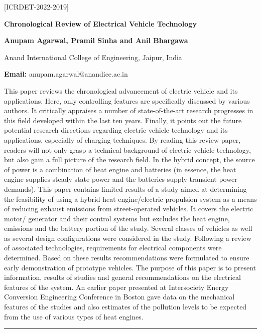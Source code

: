 \documentclass[twoside,11pt]{amsart}
\begin{document}
\vskip 5mm
\begin{flushleft}
\centerline{[ICRDET-2022-2019]}
\end{flushleft}
\begin{center}\bf\LARGE
Chronological Review of Electrical Vehicle Technology
\end{center}
\vskip 5mm

\centerline{\textbf{ Anupam Agarwal, Pramil Sinha and Anil Bhargawa }}
\vskip 5mm
\begin{flushleft}
Anand International College of Engineering, Jaipur, India
\vskip 5mm
\end{flushleft}
\vskip 2mm
\begin{flushleft}
{\bf Email:} anupam.agarwal@anandice.ac.in
\end{flushleft}
\vskip 5mm
This paper reviews the chronological advancement of electric vehicle and its applications. Here, only controlling features are specifically discussed by various authors. It critically appraises a number of state-of-the-art research progresses in this field developed within the last ten years. Finally, it points out the future potential research directions regarding electric vehicle technology and its applications, especially of charging techniques. By reading this review paper, readers will not only grasp a technical background of electric vehicle technology, but also gain a full picture of the research field. In the hybrid concept, the source of power is a combination of heat engine and batteries (in essence, the heat engine supplies steady state power and the batteries supply transient power demands). This paper contains limited results of a study aimed at determining the feasibility of using a hybrid heat engine/electric propulsion system as a means of reducing exhaust emissions from street-operated vehicles. It covers the electric motor/ generator and their control systems but excludes the heat engine, emissions and the battery portion of the study. Several classes of vehicles as well as several design configurations were considered in the study. Following a review of associated technologies, requirements for electrical components were determined. Based on these results recommendations were formulated to ensure early demonstration of prototype vehicles.
\vskip 2mm
\newpage
\vskip 2mm
 The purpose of this paper is to present information, results of studies and general recommendations on the electrical features of the system. An earlier paper presented at Intersociety Energy Conversion Engineering Conference in Boston gave data on the mechanical features of the studies and also estimates of the pollution levels to be expected from the use of various types of heat engines.
\vskip 2mm
\rule{\textwidth}{0.5pt}
\end{document}
